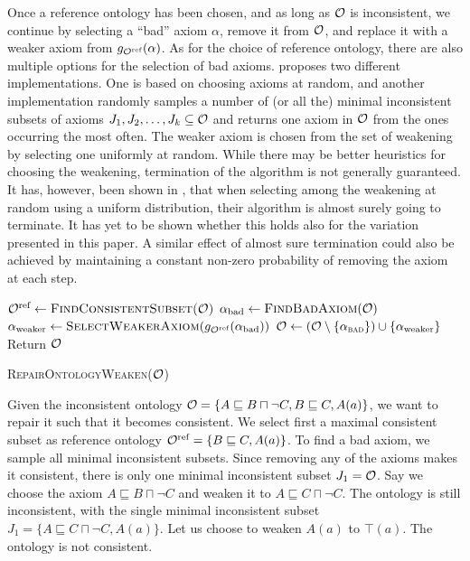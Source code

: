 Once a reference ontology has been chosen, and as long as $\mathcal{O}$ is inconsistent, we continue by selecting a ``bad'' axiom $\alpha$, remove it from $\mathcal{O}$, and replace it with a weaker axiom from $g_{\mathcal{O}^\textnormal{ref}}(\alpha)$. As for the choice of reference ontology, there are also multiple options for the selection of bad axioms. \cite{troquard2018repairing} proposes two different implementations. One is based on choosing axioms at random, and another implementation randomly samples a number of (or all the) minimal inconsistent subsets of axioms $J_1, J_2, \dots, J_k \subseteq \mathcal{O}$ and returns one axiom in $\mathcal{O}$ from the ones occurring the most often. The weaker axiom is chosen from the set of weakening by selecting one uniformly at random. While there may be better heuristics for choosing the weakening, termination of the algorithm is not generally guaranteed. It has, however, been shown in \cite{confalonieri2020towards}, that when selecting among the weakening at random using a uniform distribution, their algorithm is almost surely going to terminate. It has yet to be shown whether this holds also for the variation presented in this paper. A similar effect of almost sure termination could also be achieved by maintaining a constant non-zero probability of removing the axiom at each step.

\begin{algorithm}[ht]
  \begin{algorithmic}
    \State ${\mathcal{O}^\textnormal{ref}} \gets \textsc{FindConsistentSubset(\ensuremath{\mathcal{O}})}$
      \State $\alpha_\textnormal{bad} \gets \textsc{FindBadAxiom}(\mathcal{O})$
      \State $\alpha_\textnormal{weaker} \gets \textsc{SelectWeakerAxiom}(g_{\mathcal{O}^\textnormal{ref}}(\alpha_\textnormal{bad}))$
      \State $\mathcal{O} \gets (\mathcal{O} \setminus \{\alpha_\textsc{bad}\}) \cup \{\alpha_\textnormal{weaker}\}$
    \EndWhile
    \State Return $\mathcal{O}$
  \end{algorithmic}
  \caption{\textsc{RepairOntologyWeaken}($\mathcal{O}$)}
  \label{algo:repair-weaken-alc}
\end{algorithm}

\begin{example}\label{ex:alc-weakening}
  Given the inconsistent ontology $\mathcal{O} = \{ A \sqsubseteq B \sqcap \lnot C, B \sqsubseteq C, A(a) \}$, we want to repair it such that it becomes consistent. We select first a maximal consistent subset as reference ontology ${\mathcal{O}^\textnormal{ref}} = \{ B \sqsubseteq C, A(a) \}$. To find a bad axiom, we sample all minimal inconsistent subsets. Since removing any of the axioms makes it consistent, there is only one minimal inconsistent subset $J_1 = \mathcal{O}$. Say we choose the axiom $A \sqsubseteq B \sqcap \lnot C$ and weaken it to $A \sqsubseteq C \sqcap \lnot C$. The ontology is still inconsistent, with the single minimal inconsistent subset $J_1 = \{ A \sqsubseteq C \sqcap \lnot C, A(a) \}$. Let us choose to weaken $A(a)$ to $\top(a)$. The ontology is not consistent.
\end{example}

